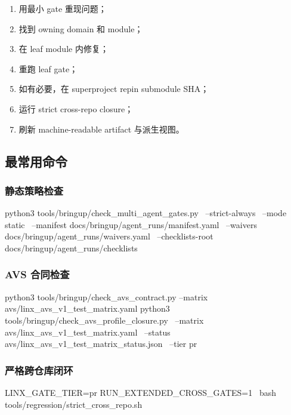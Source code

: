 \documentclass[UTF8,11pt,a4paper]{ctexart}
\begin{document}
\begin{enumerate}
  \item 用最小 gate 重现问题；
  \item 找到 owning domain 和 module；
  \item 在 leaf module 内修复；
  \item 重跑 leaf gate；
  \item 如有必要，在 superproject repin submodule SHA；
  \item 运行 strict cross-repo closure；
  \item 刷新 machine-readable artifact 与派生视图。
\end{enumerate}

\subsection{最常用命令}

\subsubsection{静态策略检查}

\begin{CodeBlock}
python3 tools/bringup/check_multi_agent_gates.py \
  --strict-always \
  --mode static \
  --manifest docs/bringup/agent_runs/manifest.yaml \
  --waivers docs/bringup/agent_runs/waivers.yaml \
  --checklists-root docs/bringup/agent_runs/checklists
\end{CodeBlock}

\subsubsection{AVS 合同检查}

\begin{CodeBlock}
python3 tools/bringup/check_avs_contract.py --matrix avs/linx_avs_v1_test_matrix.yaml
python3 tools/bringup/check_avs_profile_closure.py \
  --matrix avs/linx_avs_v1_test_matrix.yaml \
  --status avs/linx_avs_v1_test_matrix_status.json \
  --tier pr
\end{CodeBlock}

\subsubsection{严格跨仓库闭环}

\begin{CodeBlock}
LINX_GATE_TIER=pr RUN_EXTENDED_CROSS_GATES=1 \
bash tools/regression/strict_cross_repo.sh
\end{CodeBlock}
\end{document}
